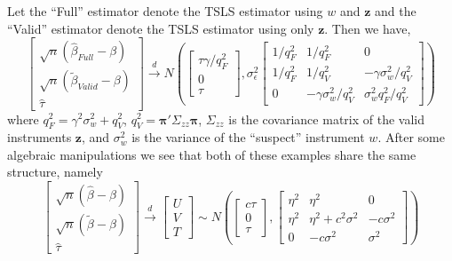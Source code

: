 Let the ``Full'' estimator denote the TSLS estimator using $w$ and $\mathbf{z}$ and the ``Valid'' estimator denote the TSLS estimator using only $\mathbf{z}$.
Then we have,
\begin{equation*}
  \left[ 
  \begin{array}{c}
    \sqrt{n} \left( \widehat{\beta}_{Full} - \beta \right)\\
    \sqrt{n} \left( \widetilde{\beta}_{Valid} - \beta \right)\\
    \widehat{\tau}
\end{array}
\right] \overset{d}{\rightarrow} N\left( \left[
\begin{array}{c}
  \tau\gamma/q^2_{F} \\ 0 \\ \tau
\end{array}
\right], \sigma_{\epsilon}^2 
\left[
\begin{array}{ccc}
  1/q_{F}^2 & 1/q_{F}^2 & 0\\
  1/q_{F}^2 & 1/q_{V}^2 & -\gamma\sigma_w^2/q^2_{V}\\ 
  0 & -\gamma\sigma_w^2/q^2_{V} & \sigma_w^2 q^2_{F}/q^2_{V}
\end{array}
\right]\right)
\end{equation*}
where $q^2_{F} = \gamma^2 \sigma_w^2 + q^2_{V}$, $q^2_{V} = \boldsymbol{\pi}'\Sigma_{zz}\boldsymbol{\pi}$, $\Sigma_{zz}$ is the covariance matrix of the valid instruments $\mathbf{z}$, and $\sigma_w^2$ is the variance of the ``suspect'' instrument $w$.
After some algebraic manipulations we see that both of these examples share the same structure, namely
\begin{equation}
  \label{eq:limitExperiment}
  \left[ 
  \begin{array}{c}
    \sqrt{n} \left( \widehat{\beta} - \beta \right)\\
    \sqrt{n} \left( \widetilde{\beta} - \beta \right)\\
    \widehat{\tau}
\end{array}
\right] \overset{d}{\rightarrow} 
\left[
\begin{array}{c}
  U \\ V \\ T
\end{array}
\right] \sim
N\left( \left[
\begin{array}{c}
  c\tau\\ 0 \\ \tau
\end{array}
\right], 
\left[
\begin{array}{ccc}
  \eta^2 & \eta^2 & 0\\
  \eta^2 & \eta^2 + c^2 \sigma^2 & -c\sigma^2\\ 
  0 & -c\sigma^2 & \sigma^2 
\end{array}
\right]\right)
\end{equation}
